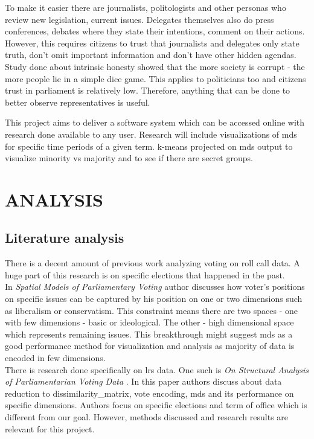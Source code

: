 \documentclass[a4paper,12pt]{article}
\begin{document}
	To make it easier there are journalists, politologists and other personas who review new legislation, current issues. Delegates themselves also do press conferences, debates where they state their intentions, comment on their actions. However, this requires citizens to trust that journalists and delegates only state truth, don't omit important information and don't have other hidden agendas. Study done about intrinsic honesty showed that the more society is corrupt - the more people lie in a simple dice game. This applies to politicians too and citizens trust in parliament is relatively low.  Therefore, anything that can be done to better observe representatives is useful.
	
	This project aims to deliver a software system which can be accessed online with research done available to any user. Research will include visualizations of \acrfull{mds} for specific time periods of a given term. \Gls{k-means} projected on \gls{mds} output to visualize minority vs majority and to see if there are secret groups.
	
	\clearpage
	
	\section{ANALYSIS}
	
	\subsection{Literature analysis}
	
	There is a decent amount of previous work analyzing voting on roll call data. A huge part of this research is on specific elections that happened in the past.\\	
	
	In \textit{Spatial Models of Parliamentary Voting} \cite{poole_2005} author discusses how voter's positions on specific issues can be captured by his position on one or two dimensions such as liberalism or conservatism. This constraint means there are two spaces - one with few dimensions - basic  or ideological. The other - high dimensional space which represents remaining issues. This breakthrough might suggest \acrlong{mds} as a good performance method for visualization and analysis as majority of data is encoded in few dimensions.\\
	
	
	There is research done specifically on \gls{lrs} data. One such is \textit{On Structural Analysis of Parliamentarian Voting Data} \cite{DBLP:journals/informaticaLT/KrilaviciusZ08}. In this paper authors discuss about data reduction to \gls{dissimilarity_matrix}, vote encoding, \gls{mds} and its performance on specific dimensions. Authors focus on specific elections and term of office which is different from our goal. However, methods discussed and research results are relevant for this project.\\
	
\end{document}
